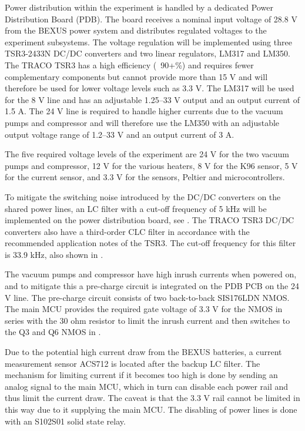 Power distribution within the experiment is handled by a dedicated Power Distribution Board (PDB). The board receives a nominal input voltage of 28.8 V from the BEXUS power system and distributes regulated voltages to the experiment subsystems. The voltage regulation will be implemented using three TSR3-2433N DC/DC converters and two linear regulators, LM317 and LM350. The TRACO TSR3 has a high efficiency (~90+\%) and requires fewer complementary components but cannot provide more than 15 V and will therefore be used for lower voltage levels such as 3.3 V. The LM317 will be used for the 8 V line and has an adjustable 1.25--33 V output and an output current of 1.5 A. The 24 V line is required to handle higher currents due to the vacuum pumps and compressor and will therefore use the LM350 with an adjustable output voltage range of 1.2--33 V and an output current of 3 A.

The five required voltage levels of the experiment are 24 V for the two vacuum pumps and compressor, 12 V for the various heaters, 8 V for the K96 sensor, 5 V for the current sensor, and 3.3 V for the sensors, Peltier and microcontrollers.

To mitigate the switching noise introduced by the DC/DC converters on the shared power lines, an LC filter with a cut-off frequency of 5 kHz will be implemented on the power distribution board, see . The TRACO TSR3 DC/DC converters also have a third-order CLC filter in accordance with the recommended application notes of the TSR3. The cut-off frequency for this filter is 33.9 kHz, also shown in .

The vacuum pumps and compressor have high inrush currents when powered on, and to mitigate this a pre-charge circuit is integrated on the PDB PCB on the 24 V line. The pre-charge circuit consists of two back-to-back SIS176LDN NMOS. The main MCU provides the required gate voltage of 3.3 V for the NMOS in series with the 30 ohm resistor to limit the inrush current and then switches to the Q3 and Q6 NMOS in .

Due to the potential high current draw from the BEXUS batteries, a current measurement sensor ACS712 is located after the backup LC filter. The mechanism for limiting current if it becomes too high is done by sending an analog signal to the main MCU, which in turn can disable each power rail and thus limit the current draw. The caveat is that the 3.3 V rail cannot be limited in this way due to it supplying the main MCU. The disabling of power lines is done with an S102S01 solid state relay.

